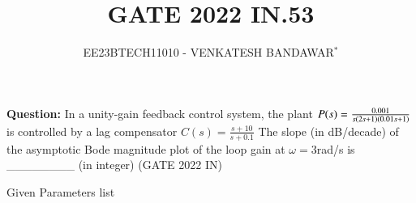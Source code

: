 \documentclass[journal,12pt,twocolumn]{IEEEtran}
\theoremstyle{remark}
\begin{document}

\vspace{3cm}

\title{GATE 2022 IN.53}
\author{EE23BTECH11010 - VENKATESH BANDAWAR$^{*}$%
}
\maketitle
\newpage
\bigskip
\textbf{Question:} In a unity-gain feedback control system, the plant
$P(s) = \frac{0.001}{s\left(2s+1\right)\left(0.01s+1\right)}$
is controlled by a lag compensator
$C(s) = \frac{s+10}{s+0.1}$
The slope (in dB/decade) of the asymptotic Bode magnitude plot of the loop gain
at $\omega= 3 $rad/s is \_\_\_\_\_\_\_\_ (in integer)
\hfill(GATE 2022 IN)\\
\solution
\begin{table}[!h]
    \centering
    
    \caption{Given Parameters list}
    \label{tab:Given Parameters list.gate2022.IN.53}
\end{table}
\end{document}
